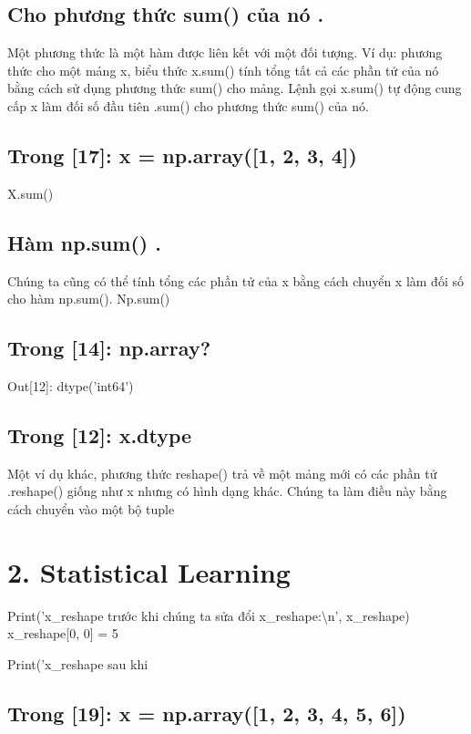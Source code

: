 \subsection{Cho phương thức sum() của nó .}

Một phương thức là một hàm được liên kết với một đối tượng. Ví dụ: phương thức cho một mảng x, biểu thức x.sum() tính tổng tất cả các phần tử của nó bằng cách sử dụng phương thức sum() cho mảng. Lệnh gọi x.sum() tự động cung cấp x làm đối số đầu tiên .sum() cho phương thức sum() của nó.

\subsection{Trong [17]: x = np.array([1, 2, 3, 4])}

X.sum()

\subsection{Hàm np.sum() .}

Chúng ta cũng có thể tính tổng các phần tử của x bằng cách chuyển x làm đối số cho hàm np.sum(). Np.sum()

\subsection{Trong [14]: np.array?}

Out[12]: dtype('int64')

\subsection{Trong [12]: x.dtype}

Một ví dụ khác, phương thức reshape() trả về một mảng mới có các phần tử .reshape() giống như x nhưng có hình dạng khác. Chúng ta làm điều này bằng cách chuyển vào một bộ tuple

\section{2. Statistical Learning}

Print('x\_reshape trước khi chúng ta sửa đổi x\_reshape:\textbackslash{}n', x\_reshape) x\_reshape[0, 0] = 5

Print('x\_reshape sau khi

\subsection{Trong [19]: x = np.array([1, 2, 3, 4, 5, 6])}

